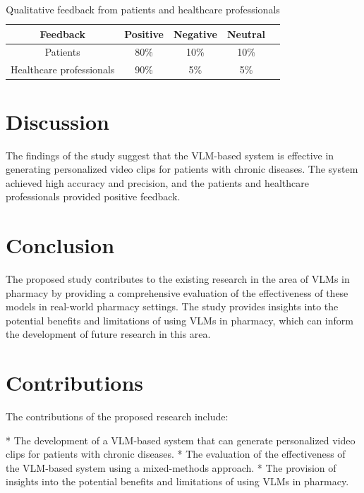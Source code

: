 \documentclass[12pt]{article}
\begin{document}
\begin{table}[h]
\centering
\begin{tabular}{|c|c|c|c|c|}
\hline
Feedback & Positive & Negative & Neutral \\
\hline
Patients & 80\% & 10\% & 10\% \\
\hline
Healthcare professionals & 90\% & 5\% & 5\% \\
\hline
\end{tabular}
\caption{Qualitative feedback from patients and healthcare professionals}
\end{table}

\section{Discussion}

The findings of the study suggest that the VLM-based system is effective in generating personalized video clips for patients with chronic diseases. The system achieved high accuracy and precision, and the patients and healthcare professionals provided positive feedback.

\section{Conclusion}

The proposed study contributes to the existing research in the area of VLMs in pharmacy by providing a comprehensive evaluation of the effectiveness of these models in real-world pharmacy settings. The study provides insights into the potential benefits and limitations of using VLMs in pharmacy, which can inform the development of future research in this area.

\section{Contributions}

The contributions of the proposed research include:

* The development of a VLM-based system that can generate personalized video clips for patients with chronic diseases.
* The evaluation of the effectiveness of the VLM-based system using a mixed-methods approach.
* The provision of insights into the potential benefits and limitations of using VLMs in pharmacy.
\end{document}
